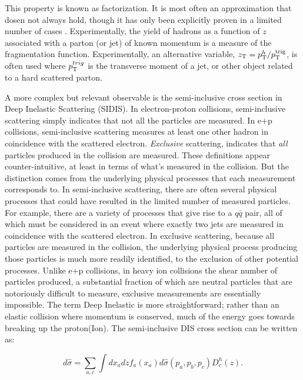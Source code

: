   This property is known as factorization. It is most often an approximation that dosen not always hold, though it has only been explicitly proven in a limited number of cases \cite{Collins1989}. Experimentally, the yield of hadrons as a function of $z$ associated with a parton (or jet) of known momentum is a measure of the fragmentation function. Experimentally, an alternative variable, $z_{\mathrm{T}}=p_{\mathrm{T}}^h/p_{\mathrm{T}}^\mathrm{trig}$, is often used where $p_{\mathrm{T}}^{trig}$ is the transverse moment of a jet, or other object related to a hard scattered parton. 

A more complex but relevant observable is the semi-inclusive cross section in Deep Inelastic Scattering (SIDIS). In electron-proton collisions, semi-inclusive scattering simply indicates that not all the particles are measured. In e+p collisions, semi-inclusive scattering measures at least one other hadron in coincidence with the scattered electron. \textit{Exclusive} scattering, indicates that \textit{all} particles produced in the collision are measured. These definitions appear counter-intuitive, at least in terms of what's measured in the collision. But the distinction comes from the underlying physical processes that each measurement corresponds to. In semi-inclusive scattering, there are often several physical processes that could have resulted in the limited number of measured particles. For example, there are a variety of processes that give rise to a $q\bar{q}$ pair, all of which must be considered in an event where exactly two jets are measured in coincidence with the scattered electron. In exclusive scattering, because all particles are measured in the collision, the underlying physical process producing those particles is much  more readily identified, to the exclusion of other potential processes. Unlike e+p collisions, in heavy ion collisions the shear number of particles produced, a substantial fraction of which are neutral particles that are notoriously difficult to measure, exclusive measurements are essentially impossible. The term Deep Inelastic is more straightforward; rather than an elastic collision where momentum is conserved, much of the energy goes towards breaking up the proton(Ion). The semi-inclusive DIS cross section can be written as:

  \begin{equation}
    d\hat{\sigma}= \sum_{a,c} \int dx_a dz f_a(x_a) d\hat{\sigma}(p_a,p_b,p_c) D_c^h(z).
    \label{sidis_cross_section}
  \end{equation}

